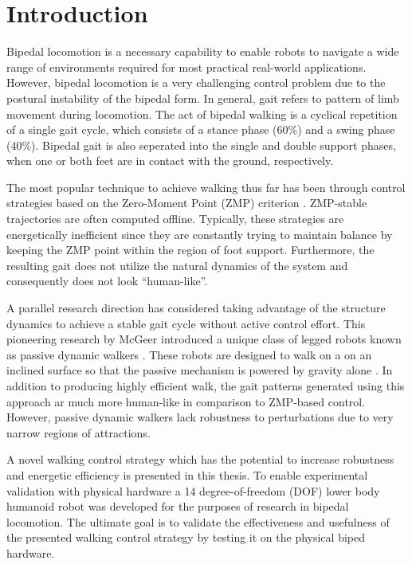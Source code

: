 \chapter{Introduction} %
\label{cha:introduction}
Bipedal locomotion is a necessary capability to enable robots to navigate a wide range of environments required for most practical real-world applications. However, bipedal locomotion is a very challenging control problem due to the postural instability of the bipedal form. In general, gait refers to pattern of limb movement during locomotion. The act of bipedal walking is a cyclical repetition of a single gait cycle, which consists of a stance phase (60\%) and a swing phase (40\%). Bipedal gait is also seperated into the single and double support phases, when one or both feet are in contact with the ground, respectively. 

The most popular technique to achieve walking thus far has been through control strategies based on the Zero-Moment Point (ZMP) criterion \cite{Vukobratovic:2004wy}. ZMP-stable trajectories are often computed offline. Typically, these strategies \cite{Kajita:1997vr,Sugihara:2002kq} are energetically inefficient since they are constantly trying to maintain balance by keeping the ZMP point within the region of foot support. Furthermore, the resulting gait does not utilize the natural dynamics of the system and consequently does not look ``human-like''. 

A parallel research direction has considered taking advantage of the structure dynamics to achieve a stable gait cycle without active control effort. This pioneering research by McGeer \cite{McGeer:1990uk} introduced a unique class of legged robots known as passive dynamic walkers \cite{Collins:2005vp}. These robots are designed to walk on a on an inclined surface so that the passive mechanism is powered by gravity alone \cite{Spong:1999vk}. In addition to producing highly efficient walk, the gait patterns generated using this approach ar much more human-like in comparison to ZMP-based control. However, passive dynamic walkers lack robustness to perturbations due to very narrow regions of attractions. 

A novel walking control strategy which has the potential to increase robustness and energetic efficiency is presented in this thesis. To enable experimental validation with physical hardware a 14 degree-of-freedom (DOF) lower body humanoid robot was developed for the purposes of research in bipedal locomotion. The ultimate goal is to validate the effectiveness and usefulness of the presented walking control strategy by testing it on the physical biped hardware. 

